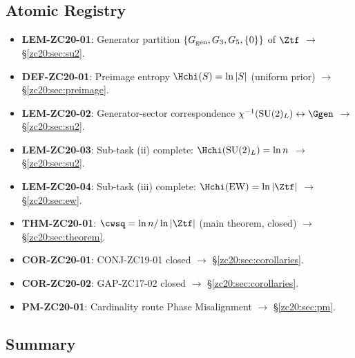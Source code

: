 \documentclass[12pt, a4paper]{article}
\begin{document}
\subsection{Atomic Registry}
\label{zc20:sec:registry}

\begin{formalbox}[title={Atomic Units Introduced by TASK-ZC20 (8 new units)}]
\begin{itemize}[leftmargin=*, noitemsep]
  \item \textbf{LEM-ZC20-01}: Generator partition
    $\{G_{\rm gen}, G_3, G_5, \{0\}\}$ of $\Ztf$
    $\to$ \S\ref{zc20:sec:su2}.
  \item \textbf{DEF-ZC20-01}: Preimage entropy
    $\Hchi(S) = \ln|S|$ (uniform prior)
    $\to$ \S\ref{zc20:sec:preimage}.
  \item \textbf{LEM-ZC20-02}: Generator-sector correspondence
    $\chi^{-1}(\mathrm{SU}(2)_L) \leftrightarrow \Ggen$
    $\to$ \S\ref{zc20:sec:su2}.
  \item \textbf{LEM-ZC20-03}: Sub-task (ii) complete:
    $\Hchi(\mathrm{SU}(2)_L) = \ln n$
    $\to$ \S\ref{zc20:sec:su2}.
  \item \textbf{LEM-ZC20-04}: Sub-task (iii) complete:
    $\Hchi(\mathrm{EW}) = \ln|\Ztf|$
    $\to$ \S\ref{zc20:sec:ew}.
  \item \textbf{THM-ZC20-01}: $\cwsq = \ln n/\ln|\Ztf|$
    (main theorem, closed)
    $\to$ \S\ref{zc20:sec:theorem}.
  \item \textbf{COR-ZC20-01}: CONJ-ZC19-01 closed
    $\to$ \S\ref{zc20:sec:corollaries}.
  \item \textbf{COR-ZC20-02}: GAP-ZC17-02 closed
    $\to$ \S\ref{zc20:sec:corollaries}.
  \item \textbf{PM-ZC20-01}: Cardinality route Phase Misalignment
    $\to$ \S\ref{zc20:sec:pm}.
\end{itemize}
\end{formalbox}

\subsection{Summary}
\label{zc20:sec:summary}
\end{document}

